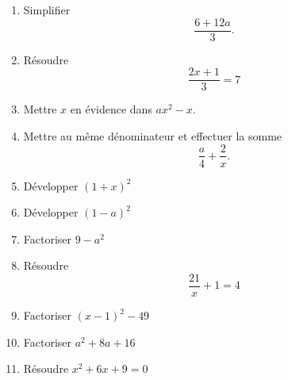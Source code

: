 \begin{exercice}
\begin{multicols}{2}
\begin{enumerate}
            \item
                Simplifier
                \begin{equation*}
                    \frac{ 6+12a }{ 3 }.
                \end{equation*}
            \item
                Résoudre
                \begin{equation*}
                    \frac{ 2x+1 }{ 3 }=7
                \end{equation*}

            \item
                Mettre \( x\) en évidence dans \( ax^2-x\).
            \item
                Mettre au même dénominateur et effectuer la somme
                \begin{equation*}
                    \frac{ a }{ 4 }+\frac{ 2 }{ x }.
                \end{equation*}

            \item
                 Développer \( (1+x)^2\)
             \item
                 Développer \( (1-a)^2\)
             \item
                 Factoriser \( 9-a^2\)
             \item
                 Résoudre
                 \begin{equation}
                     \frac{ 21 }{ x }+1=4
                 \end{equation}
             \item
                 Factoriser \( (x-1)^2-49\)
             \item
                 Factoriser \( a^2+8a+16\)
             \item
                 Résoudre \( x^2+6x+9=0\)

         \end{enumerate}
             \end{multicols}
\end{exercice}

\newcommand{\CaptionFigBpCNVm}{figure de l'exercice \ref{exosmath-0018}} 


